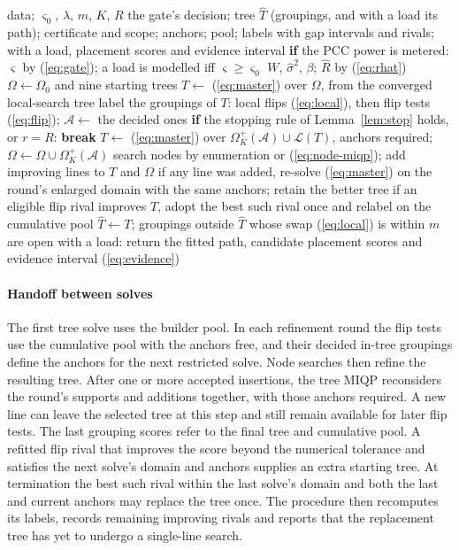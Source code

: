 \documentclass[journal,onecolumn,11pt]{IEEEtran}
\newcommand{\Lin}{\mathcal{L}}
\newcommand{\Aset}{\mathcal{A}}
\begin{document}
\begin{algorithm}[t]
\caption{\textsc{Identify}: tree selection, node refinement and grouping scores}\label{alg:identify}
\begin{algorithmic}[1]
\Require data; $\varsigma_0$, $\lambda$, $m$, $K$, $R$
\Ensure the gate's decision; tree $\hat T$ (groupings, and with a load its path); certificate and scope; anchors; pool;
labels with gap intervals and rivals; with a load, placement scores and evidence interval
\State \textbf{if} the PCC power is metered: $\varsigma$ by (\ref{eq:gate}); a load is modelled iff $\varsigma\ge\varsigma_0$ 
\State $W$, $\hat\sigma^2$, $\beta$; $\hat R$ by (\ref{eq:rhat}) 
\State $\Omega\gets\Omega_0$ and nine starting trees 
\State $T\gets$ (\ref{eq:master}) over $\Omega$, from the converged local-search tree
  \State label the groupings of $T$: local flips (\ref{eq:local}), then flip tests (\ref{eq:flip}); $\Aset\gets$ the decided ones
  \State \textbf{if} the stopping rule of Lemma~\ref{lem:stop} holds, or $r=R$: \textbf{break}
  \State $T\gets$ (\ref{eq:master}) over $\Omega^+_K(\Aset)\cup\Lin(T)$, anchors required; $\Omega\gets\Omega\cup\Omega^+_K(\Aset)$
  \State search nodes by enumeration or (\ref{eq:node-miqp}); add improving lines to $T$ and $\Omega$
  \State if any line was added, re-solve (\ref{eq:master}) on the round's enlarged domain with the same anchors; retain the better tree
\EndFor
\State if an eligible flip rival improves $T$, adopt the best such rival once and relabel on the cumulative pool
\State $\hat T\gets T$; groupings outside $\hat T$ whose swap (\ref{eq:local}) is within $m$ are open
\State with a load: return the fitted path, candidate placement scores and evidence interval (\ref{eq:evidence})
\end{algorithmic}
\end{algorithm}

\paragraph*{Handoff between solves}
The first tree solve uses the builder pool. In each refinement round the flip tests use the cumulative pool with
the anchors free, and their decided in-tree groupings define the anchors for the next restricted solve.
Node searches then refine the resulting tree. After one or more accepted insertions, the tree MIQP reconsiders
the round's supports and additions together, with those anchors required. A new line can leave the selected tree
at this step and still remain available for later flip tests. The last grouping scores refer to the final tree and
cumulative pool. A refitted flip rival that improves the score beyond the numerical tolerance and satisfies the
next solve's domain and anchors supplies an extra starting tree. At termination the best such rival within the
last solve's domain and both the last and current anchors may replace the tree once. The procedure then recomputes
its labels, records remaining improving rivals and reports that the replacement tree has yet to undergo a single-line search.
\end{document}
